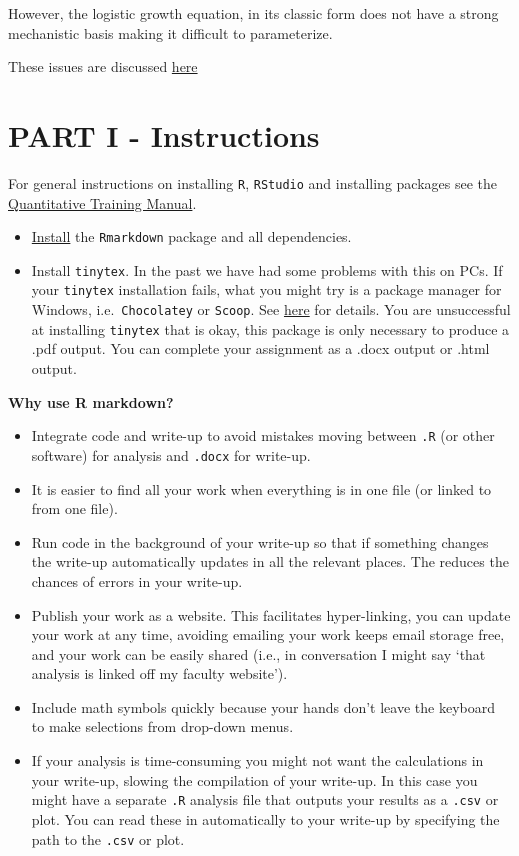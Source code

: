 \documentclass[
]{book}
\providecommand{\tightlist}{%
  \setlength{\itemsep}{0pt}\setlength{\parskip}{0pt}}
\begin{document}
However, the logistic growth equation, in its classic form does not have a strong mechanistic basis making it difficult to parameterize.

These issues are discussed \href{https://www.sciencedirect.com/science/article/pii/S030438000400554X?via\%3Dihub}{here}

\hypertarget{partI}{%
\chapter*{PART I - Instructions}\label{partI}}

For general instructions on installing \texttt{R}, \texttt{RStudio} and installing packages see the \href{https://ahurford.github.io/quant-guide-all-courses/}{Quantitative Training Manual}.

\begin{itemize}
\tightlist
\item
  \href{https://ahurford.github.io/quant-guide-all-courses/install.html}{Install} the \texttt{Rmarkdown} package and all dependencies.
\item
  Install \texttt{tinytex}. In the past we have had some problems with this on PCs. If your \texttt{tinytex} installation fails, what you might try is a package manager for Windows, i.e.~\texttt{Chocolatey} or \texttt{Scoop}. See \href{https://github.com/rstudio/tinytex-releases}{here} for details. You are unsuccessful at installing \texttt{tinytex} that is okay, this package is only necessary to produce a .pdf output. You can complete your assignment as a .docx output or .html output.
\end{itemize}

\textbf{Why use R markdown?}

\begin{itemize}
\item
  Integrate code and write-up to avoid mistakes moving between \texttt{.R} (or other software) for analysis and \texttt{.docx} for write-up.
\item
  It is easier to find all your work when everything is in one file (or linked to from one file).
\item
  Run code in the background of your write-up so that if something changes the write-up automatically updates in all the relevant places. The reduces the chances of errors in your write-up.
\item
  Publish your work as a website. This facilitates hyper-linking, you can update your work at any time, avoiding emailing your work keeps email storage free, and your work can be easily shared (i.e., in conversation I might say `that analysis is linked off my faculty website').
\item
  Include math symbols quickly because your hands don't leave the keyboard to make selections from drop-down menus.
\item
  If your analysis is time-consuming you might not want the calculations in your write-up, slowing the compilation of your write-up. In this case you might have a separate \texttt{.R} analysis file that outputs your results as a \texttt{.csv} or plot. You can read these in automatically to your write-up by specifying the path to the \texttt{.csv} or plot.
\end{itemize}
\end{document}
